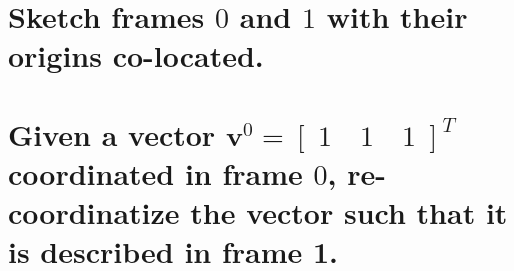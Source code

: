 \documentclass[12pt,letterpaper, onecolumn]{exam}
\begin{document}
\begin{questions}
{\begin{parts}
            \part{Sketch frames $0$ and $1$ with their origins co-located.}

            \part{Given a vector $\mathbf{v}^0 = \left[\;1 \quad 1 \quad 1\;\right]^T$ coordinated in frame $0$, re-coordinatize the vector such that it is described in frame 1.}
        \end{parts}}
    \clearpage
\end{questions}
\end{document}
